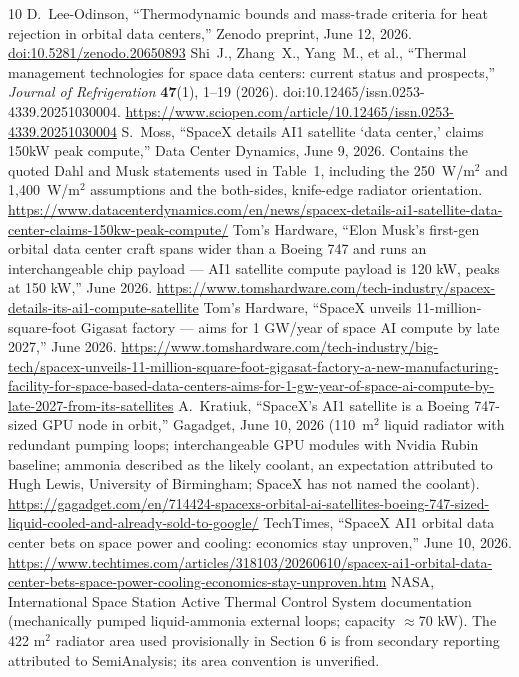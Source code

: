 \documentclass[11pt]{article}
\begin{document}
\begin{thebibliography}{10}
 D.~Lee-Odinson, ``Thermodynamic bounds and mass-trade criteria for heat rejection in orbital data centers,'' Zenodo preprint, June 12, 2026. \href{https://doi.org/10.5281/zenodo.20650893}{doi:10.5281/zenodo.20650893}
 Shi~J., Zhang~X., Yang~M., et al., ``Thermal management technologies for space data centers: current status and prospects,'' \emph{Journal of Refrigeration} \textbf{47}(1), 1--19 (2026). doi:10.12465/issn.0253-4339.20251030004. \url{https://www.sciopen.com/article/10.12465/issn.0253-4339.20251030004}
 S.~Moss, ``SpaceX details AI1 satellite `data center,' claims 150kW peak compute,'' Data Center Dynamics, June 9, 2026. Contains the quoted Dahl and Musk statements used in Table~1, including the 250~W/m$^{2}$ and 1,400~W/m$^{2}$ assumptions and the both-sides, knife-edge radiator orientation. \url{https://www.datacenterdynamics.com/en/news/spacex-details-ai1-satellite-data-center-claims-150kw-peak-compute/}
 Tom's Hardware, ``Elon Musk's first-gen orbital data center craft spans wider than a Boeing 747 and runs an interchangeable chip payload --- AI1 satellite compute payload is 120 kW, peaks at 150 kW,'' June 2026. \url{https://www.tomshardware.com/tech-industry/spacex-details-its-ai1-compute-satellite}
 Tom's Hardware, ``SpaceX unveils 11-million-square-foot Gigasat factory --- aims for 1 GW/year of space AI compute by late 2027,'' June 2026. \url{https://www.tomshardware.com/tech-industry/big-tech/spacex-unveils-11-million-square-foot-gigasat-factory-a-new-manufacturing-facility-for-space-based-data-centers-aims-for-1-gw-year-of-space-ai-compute-by-late-2027-from-its-satellites}
 A.~Kratiuk, ``SpaceX's AI1 satellite is a Boeing 747-sized GPU node in orbit,'' Gagadget, June 10, 2026 (110~m$^{2}$ liquid radiator with redundant pumping loops; interchangeable GPU modules with Nvidia Rubin baseline; ammonia described as the likely coolant, an expectation attributed to Hugh Lewis, University of Birmingham; SpaceX has not named the coolant). \url{https://gagadget.com/en/714424-spacexs-orbital-ai-satellites-boeing-747-sized-liquid-cooled-and-already-sold-to-google/}
 TechTimes, ``SpaceX AI1 orbital data center bets on space power and cooling: economics stay unproven,'' June 10, 2026. \url{https://www.techtimes.com/articles/318103/20260610/spacex-ai1-orbital-data-center-bets-space-power-cooling-economics-stay-unproven.htm}
 NASA, International Space Station Active Thermal Control System documentation (mechanically pumped liquid-ammonia external loops; capacity $\approx$70 kW). The 422 m$^{2}$ radiator area used provisionally in Section 6 is from secondary reporting attributed to SemiAnalysis; its area convention is unverified.

\end{thebibliography}
\end{document}
